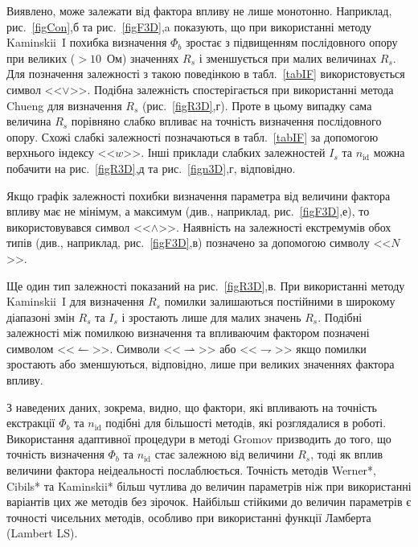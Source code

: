 Виявлено, може залежати від фактора впливу не лише монотонно.
Наприклад, рис.~\ref{figCon},б та рис.~\ref{figF3D},a показують, що при використанні методу Kaminskii~I похибка визначення $\Phi_b$ зростає з підвищенням послідовного опору при великих ($>10$~Ом) значеннях $R_s$ і зменшується при малих величинах $R_s$.
Для позначення залежності з такою поведінкою в табл.~\ref{tabIF} використовується символ <<$\vee$>>.
Подібна залежність спостерігається при використанні метода Chueng для визначення $R_s$ (рис.~\ref{figR3D},г).
Проте в цьому випадку сама величина $R_s$ порівняно слабко впливає на точність визначення послідовного опору.
Схожі слабкі залежності позначаються в табл.~\ref{tabIF} за допомогою верхнього індексу  <<$w$>>.
Інші приклади слабких залежностей $I_s$ та  $n_\mathrm{id}$ можна побачити на рис.~\ref{figR3D},д та рис.~\ref{fign3D},г, відповідно.

Якщо графік залежності похибки визначення параметра від величини фактора впливу має не мінімум, а максимум (див., наприклад, рис.~\ref{figF3D},е),
то використовувався символ <<$\wedge$>>.
Наявність на залежності екстремумів обох типів (див., наприклад, рис.~\ref{figF3D},в) позначено за допомогою символу <<$N$>>.

Ще один тип залежності показаний на рис.~\ref{figR3D},в.
При використанні методу Kaminskii~I для визначення  $R_s$ помилки залишаються постійними в широкому діапазоні змін $R_s$ та $I_s$ і зростають лише для малих значень $R_s$.
Подібні залежності між помилкою визначення та впливаючим фактором позначені символом <<$\leftharpoonup$>>.
Символи <<$\rightharpoonup$>> або <<$\rightharpoondown$>> якщо помилки зростають або зменшуються, відповідно, лише при великих значеннях фактора впливу.

З наведених даних, зокрема, видно, що фактори, які впливають на точність екстракції $\Phi_b$ та  $n_\mathrm{id}$ подібні для більшості методів, які розглядалися в роботі.
Використання адаптивної процедури в методі Gromov призводить до того, що точність визначення $\Phi_b$ та  $n_\mathrm{id}$ стає залежною від величини $R_s$, тоді як вплив величини фактора неідеальності послаблюється.
Точність методів Werner*, Cibils* та Kaminskii* більш чутлива до величин параметрів ніж при використанні варіантів цих же методів без зірочок.
Найбільш стійкими до величин параметрів є точності чисельних методів, особливо при використанні функції Ламберта (Lambert LS).



